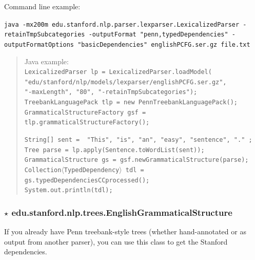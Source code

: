 \documentclass[11pt,letterpaper]{article}
\begin{document}
\bigskip

\noindent Command line example: \\
{\hangindent=0.4in
\raggedright\texttt{java -mx200m edu.stanford.nlp.parser.lexparser.LexicalizedParser -retainTmpSubcategories -outputFormat "penn,typedDependencies" -outputFormatOptions "basicDependencies" englishPCFG.ser.gz file.txt}\\}

\begin{quote}
\hspace*{-0.375in}%
Java example: \\
\small\texttt{LexicalizedParser lp = LexicalizedParser.loadModel(\\
\hspace*{1.5in}"edu/stanford/nlp/models/lexparser/englishPCFG.ser.gz",\\
\hspace*{1.5in}"-maxLength", "80", "-retainTmpSubcategories"); \\
TreebankLanguagePack tlp = new PennTreebankLanguagePack(); \\
GrammaticalStructureFactory gsf = tlp.grammaticalStructureFactory();}

\bigskip

\noindent
\texttt{String[] sent = { "This", "is", "an", "easy", "sentence", "." }; \\
Tree parse = lp.apply(Sentence.toWordList(sent)); \\
GrammaticalStructure gs = gsf.newGrammaticalStructure(parse); \\
Collection$\langle$TypedDependency$\rangle$ tdl = gs.typedDependenciesCCprocessed(); \\
System.out.println(tdl); }
\end{quote}

\subsubsection*{$\star$ \textbf{edu.stanford.nlp.trees.EnglishGrammaticalStructure}}
If you already have Penn treebank-style trees (whether hand-annotated or as output from another parser), you can use this class to get the Stanford dependencies.
\end{document}
